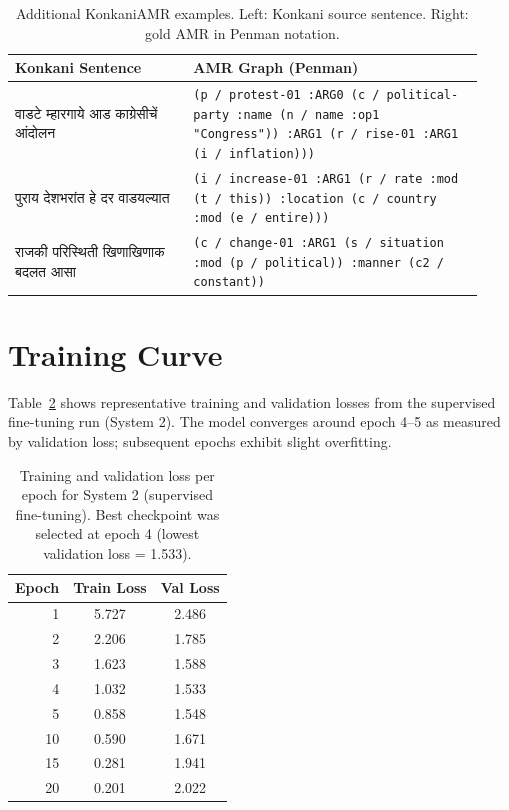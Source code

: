 \documentclass[11pt]{article}
\begin{document}
\begin{table}[h]
\centering
\small
\begin{tabular}{p{0.35\linewidth} p{0.58\linewidth}}
\toprule
\textbf{Konkani Sentence} & \textbf{AMR Graph (Penman)} \\
\midrule
वाडटे म्हारगाये आड काग्रेसीचें आंदोलन &
\texttt{(p / protest-01 :ARG0 (c / political-party :name (n / name :op1 "Congress")) :ARG1 (r / rise-01 :ARG1 (i / inflation)))} \\
\midrule
पुराय देशभरांत हे दर वाडयल्यात &
\texttt{(i / increase-01 :ARG1 (r / rate :mod (t / this)) :location (c / country :mod (e / entire)))} \\
\midrule
राजकी परिस्थिती खिणाखिणाक बदलत आसा &
\texttt{(c / change-01 :ARG1 (s / situation :mod (p / political)) :manner (c2 / constant))} \\
\bottomrule
\end{tabular}
\caption{Additional KonkaniAMR examples. Left: Konkani source sentence. Right: gold AMR in Penman notation.}
\label{tab:appendix_examples}
\end{table}

\section{Training Curve}
\label{sec:appendix_training}

Table~\ref{tab:training_curve} shows representative training and validation
losses from the supervised fine-tuning run (System 2). The model converges
around epoch 4--5 as measured by validation loss; subsequent epochs exhibit
slight overfitting.

\begin{table}[h]
\centering
\small
\begin{tabular}{rcc}
\toprule
\textbf{Epoch} & \textbf{Train Loss} & \textbf{Val Loss} \\
\midrule
1  & 5.727 & 2.486 \\
2  & 2.206 & 1.785 \\
3  & 1.623 & 1.588 \\
4  & 1.032 & 1.533 \\
5  & 0.858 & 1.548 \\
10 & 0.590 & 1.671 \\
15 & 0.281 & 1.941 \\
20 & 0.201 & 2.022 \\
\bottomrule
\end{tabular}
\caption{Training and validation loss per epoch for System 2 (supervised fine-tuning). Best checkpoint was selected at epoch 4 (lowest validation loss = 1.533).}
\label{tab:training_curve}
\end{table}
\end{document}
